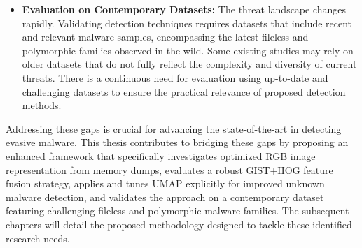 \begin{itemize}
    \item \textbf{Evaluation on Contemporary Datasets:} The threat landscape changes rapidly. Validating detection techniques requires datasets that include recent and relevant malware samples, encompassing the latest fileless and polymorphic families observed in the wild. Some existing studies may rely on older datasets that do not fully reflect the complexity and diversity of current threats. There is a continuous need for evaluation using up-to-date and challenging datasets to ensure the practical relevance of proposed detection methods.
\end{itemize}

Addressing these gaps is crucial for advancing the state-of-the-art in detecting evasive malware. This thesis contributes to bridging these gaps by proposing an enhanced framework that specifically investigates optimized RGB image representation from memory dumps, evaluates a robust GIST+HOG feature fusion strategy, applies and tunes UMAP explicitly for improved unknown malware detection, and validates the approach on a contemporary dataset featuring challenging fileless and polymorphic malware families. The subsequent chapters will detail the proposed methodology designed to tackle these identified research needs.
